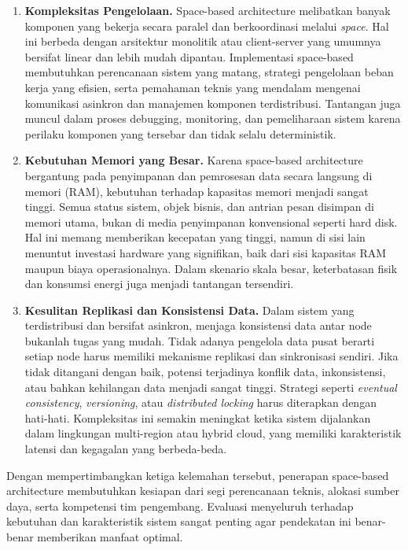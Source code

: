 \begin{enumerate}
	\item \textbf{Kompleksitas Pengelolaan.}  
	Space-based architecture melibatkan banyak komponen yang bekerja secara paralel dan berkoordinasi melalui \textit{space}. Hal ini berbeda dengan arsitektur monolitik atau client-server yang umumnya bersifat linear dan lebih mudah dipantau. Implementasi space-based membutuhkan perencanaan sistem yang matang, strategi pengelolaan beban kerja yang efisien, serta pemahaman teknis yang mendalam mengenai komunikasi asinkron dan manajemen komponen terdistribusi. Tantangan juga muncul dalam proses debugging, monitoring, dan pemeliharaan sistem karena perilaku komponen yang tersebar dan tidak selalu deterministik.
	
	\item \textbf{Kebutuhan Memori yang Besar.}  
	Karena space-based architecture bergantung pada penyimpanan dan pemrosesan data secara langsung di memori (RAM), kebutuhan terhadap kapasitas memori menjadi sangat tinggi. Semua status sistem, objek bisnis, dan antrian pesan disimpan di memori utama, bukan di media penyimpanan konvensional seperti hard disk. Hal ini memang memberikan kecepatan yang tinggi, namun di sisi lain menuntut investasi hardware yang signifikan, baik dari sisi kapasitas RAM maupun biaya operasionalnya. Dalam skenario skala besar, keterbatasan fisik dan konsumsi energi juga menjadi tantangan tersendiri.
	
	\item \textbf{Kesulitan Replikasi dan Konsistensi Data.}  
	Dalam sistem yang terdistribusi dan bersifat asinkron, menjaga konsistensi data antar node bukanlah tugas yang mudah. Tidak adanya pengelola data pusat berarti setiap node harus memiliki mekanisme replikasi dan sinkronisasi sendiri. Jika tidak ditangani dengan baik, potensi terjadinya konflik data, inkonsistensi, atau bahkan kehilangan data menjadi sangat tinggi. Strategi seperti \textit{eventual consistency}, \textit{versioning}, atau \textit{distributed locking} harus diterapkan dengan hati-hati. Kompleksitas ini semakin meningkat ketika sistem dijalankan dalam lingkungan multi-region atau hybrid cloud, yang memiliki karakteristik latensi dan kegagalan yang berbeda-beda.
\end{enumerate}

Dengan mempertimbangkan ketiga kelemahan tersebut, penerapan space-based architecture membutuhkan kesiapan dari segi perencanaan teknis, alokasi sumber daya, serta kompetensi tim pengembang. Evaluasi menyeluruh terhadap kebutuhan dan karakteristik sistem sangat penting agar pendekatan ini benar-benar memberikan manfaat optimal.


